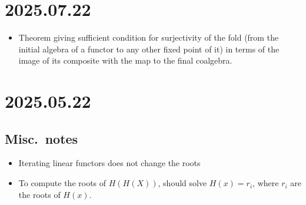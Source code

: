\documentclass[letterpaper,numbers=enddot]{scrartcl}
\begin{document}
\section*{2025.07.22}
\begin{itemize}
  \item Theorem giving sufficient condition for surjectivity of the fold
  (from the initial algebra of a functor to any other fixed point of it)
  in terms of the image of its composite with the map to the final coalgebra.

\end{itemize}

\section*{2025.05.22}
\subsection*{Misc.\ notes}
\begin{itemize}
  \item Iterating linear functors does not change the roots
  \item To compute the roots of $H(H(X))$, should solve $H(x) = r_i$, where $r_i$ are the roots of $H(x)$.
\end{itemize}
\end{document}
